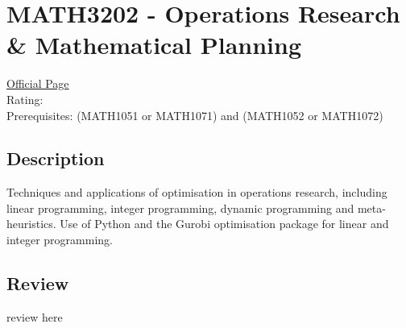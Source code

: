 \hypertarget{MATH3202}{\section{MATH3202 - Operations Research \& Mathematical Planning}}

\large
\textcolor{turbo_purple}{\href{https://my.uq.edu.au/programs-courses/course.html?course_code=MATH3202}{Official Page}} \\
Rating: \cstar\cstar\cstar\cstar\ostar \\
Prerequisites: (MATH1051 or MATH1071) and (MATH1052 or MATH1072)

\normalsize
\subsection*{Description}
Techniques and applications of optimisation in operations research, including linear programming, integer programming, dynamic programming and meta-heuristics.
Use of Python and the Gurobi optimisation package for linear and integer programming.

\subsection*{Review}
review here

